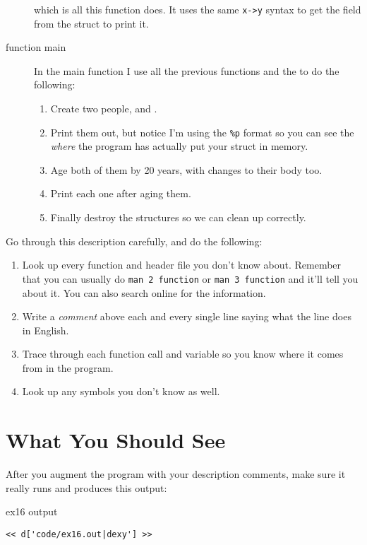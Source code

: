 \begin{description}
    which is all this function does.  It uses the same \verb|x->y|
    syntax to get the field from the struct to print it.
\item[function main] In the main function I use all the previous
    functions and the  to do the following:
    \begin{enumerate}
    \item Create two people,  and .
    \item Print them out, but notice I'm using the \verb|%p| 
        format so you can see the \emph{where} the program
        has actually put your struct in memory.
    \item Age both of them by 20 years, with changes to their
        body too.
    \item Print each one after aging them.
    \item Finally destroy the structures so we can clean up 
        correctly.
    \end{enumerate}
\end{description}

Go through this description carefully, and do the following:

\begin{enumerate}
\item Look up every function and header file you don't know about.
    Remember that you can usually do \verb|man 2 function| or
    \verb|man 3 function| and it'll tell you about it.  You can also
    search online for the information.
\item Write a \emph{comment} above each and every single line saying
    what the line does in English.
\item Trace through each function call and variable so you know where
    it comes from in the program.
\item Look up any symbols you don't know as well.
\end{enumerate}


\section{What You Should See}

After you augment the program with your description comments,
make sure it really runs and produces this output:

\begin{code}{ex16 output}
\begin{lstlisting}
<< d['code/ex16.out|dexy'] >>
\end{lstlisting}
\end{code}

